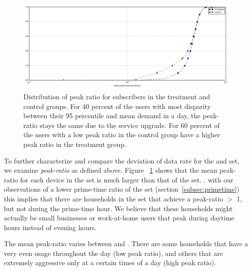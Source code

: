 \begin{figure}[t]
\begin{minipage}{1\linewidth}
\centering
\includegraphics[width=1\linewidth]{figures/peakratio-CDF-devices-MEAN.pdf}
\caption{Distribution of peak ratio for subscribers in the treatment and 
control groups. For 40 percent of the users with most disparity between their
95 percentile and mean demand in a day, the peak-ratio stays the same due to 
the service upgrade. For 60 percent of the users with a low peak ratio in the 
control group have a higher peak ratio in the treatment group. }
\label{fig:CDF-peak-ratio-mean}
\end{minipage}
\end{figure}

To further characterize and compare the deviation of data rate for the \control 
and \test set, we examine \emph{peak-ratio} as defined above. 
Figure ~\ref{fig:CDF-peak-ratio-mean} shows that the mean peak-ratio for each 
device in the \test set is much larger than that of the \control set.
.
 with our observations of a lower prime-time ratio of the  
\test set (section~\ref{subsec:primetime}) this implies that there are 
households in the \test set that achieve a peak-ratio $>$ 1, but not during the 
prime-time hour. We believe that these households might actually be small 
businesses or work-at-home users that peak during daytime hours instead of 
evening hours.

The mean peak-ratio varies between  and . There are 
some households that have a very even usage throughout the day (low peak ratio), 
and others that are extremely aggressive only at a certain times of a day (high 
peak ratio).